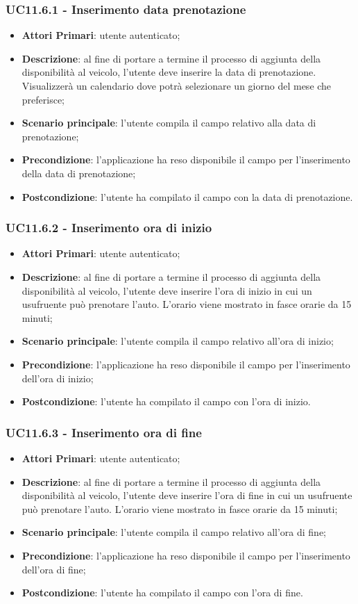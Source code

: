 \subsubsection{UC11.6.1 - Inserimento data prenotazione}
\begin{itemize}
	\item \textbf{Attori Primari}: utente autenticato;
	\item \textbf{Descrizione}: al fine di portare a termine il processo di aggiunta della disponibilità al veicolo, l'utente deve inserire la data di prenotazione. Visualizzerà un calendario dove potrà selezionare un giorno del mese che preferisce;
	\item \textbf{Scenario principale}: l'utente compila il campo relativo alla data di prenotazione;	
	\item \textbf{Precondizione}: l'applicazione ha reso disponibile il campo per l'inserimento della data di prenotazione;
	\item \textbf{Postcondizione}: l'utente ha compilato il campo con la data di prenotazione.	
\end{itemize}
\subsubsection{UC11.6.2 - Inserimento ora di inizio}
\begin{itemize}
	\item \textbf{Attori Primari}: utente autenticato;
	\item \textbf{Descrizione}: al fine di portare a termine il processo di aggiunta della disponibilità al veicolo, l'utente deve inserire l'ora di inizio in cui un usufruente può prenotare l'auto. L'orario viene mostrato in fasce orarie da 15 minuti;
	\item \textbf{Scenario principale}: l'utente compila il campo relativo all'ora di inizio;	
	\item \textbf{Precondizione}: l'applicazione ha reso disponibile il campo per l'inserimento dell'ora di inizio;
	\item \textbf{Postcondizione}: l'utente ha compilato il campo con l'ora di inizio.	
\end{itemize}
\subsubsection{UC11.6.3 - Inserimento ora di fine}
\begin{itemize}
	\item \textbf{Attori Primari}: utente autenticato;
	\item \textbf{Descrizione}: al fine di portare a termine il processo di aggiunta della disponibilità al veicolo, l'utente deve inserire l'ora di fine in cui un usufruente può prenotare l'auto. L'orario viene mostrato in fasce orarie da 15 minuti;
	\item \textbf{Scenario principale}: l'utente compila il campo relativo all'ora di fine;	
	\item \textbf{Precondizione}: l'applicazione ha reso disponibile il campo per l'inserimento dell'ora di fine;
	\item \textbf{Postcondizione}: l'utente ha compilato il campo con l'ora di fine.	
\end{itemize}
